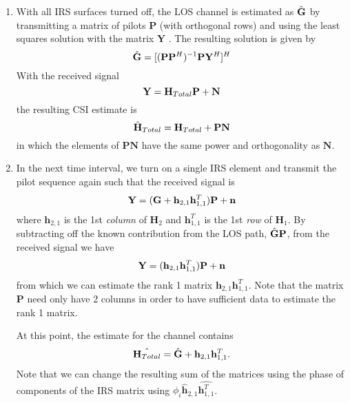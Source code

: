 \documentclass[12pt,a4paper]{report}
\begin{document}
	\begin{enumerate}
	\item
		With all IRS surfaces turned off, the LOS channel is estimated as $\hat{\mathbf{G}}$ by 
		transmitting a matrix of pilots $\mathbf{P}$ (with orthogonal rows)  and using the least squares solution with the matrix $\mathbf{Y}$ \cite{nadeem2019intelligent}.
		The resulting solution is given by
		\begin{equation}
			\hat{\mathbf{G}} = [(\mathbf{P} \mathbf{P}^H)^{-1} \mathbf{P} \mathbf{Y}^H]^H
		\end{equation}
		With the received signal
		\begin{equation}
		 \mathbf{Y} = \mathbf{H}_{Total} \mathbf{P} + \mathbf{N}
		\end{equation}
			the resulting CSI estimate is 
					\begin{equation}
		 \hat{\mathbf{H}}_{Total} = \mathbf{H}_{Total} + \mathbf{P}\mathbf{N}
		\end{equation}
		in which the elements of $\mathbf{P}\mathbf{N}$ have the same power and orthogonality as $\mathbf{N}$.
	\item 	
		In the next time interval, we turn on a single IRS element and transmit the pilot sequence again such that the received signal is 
			\begin{equation*}
			\mathbf{Y} = (\mathbf{G} + \mathbf{h}_{2,1}\mathbf{h}^T_{1,1}  )\mathbf{P}  + \mathbf{n}
			\end{equation*}
			where $\mathbf{h}_{2,1}$ is the 1st \emph{column} of $ \mathbf{H}_{2}$ and $\mathbf{h}_{1,1}^T$  is the 1st \emph{row} of $\mathbf{H}_{1}$.
			By subtracting off the known contribution from the LOS path, $\hat{\mathbf{G}}\mathbf{P}$, from the received signal we have 
						\begin{equation*}
						\mathbf{Y} = (\mathbf{h}_{2,1}\mathbf{h}^T_{1,1})\mathbf{P}  + \mathbf{n}
						\end{equation*}
			from which we can estimate the rank 1 matrix $\mathbf{h}_{2,1}\mathbf{h}^T_{1,1}$.
			Note that the matrix $\mathbf{P} $ need only have 2 columns in order to have sufficient data to estimate the rank 1 matrix.
			\par
			At this point, the estimate for the channel contains
				\begin{equation*}
				\hat{\mathbf{H}_{Total}} = \hat{\mathbf{G}} + \mathbf{h}_{2,1}\mathbf{h}^T_{1,1}.
				\end{equation*}
				Note that we can change the resulting sum of the matrices using the phase of components of the IRS matrix using  $\phi_i \hat{\mathbf{h}}_{2,1}\hat{\mathbf{h}^T_{1,1}} $.

\end{enumerate}
\end{document}
